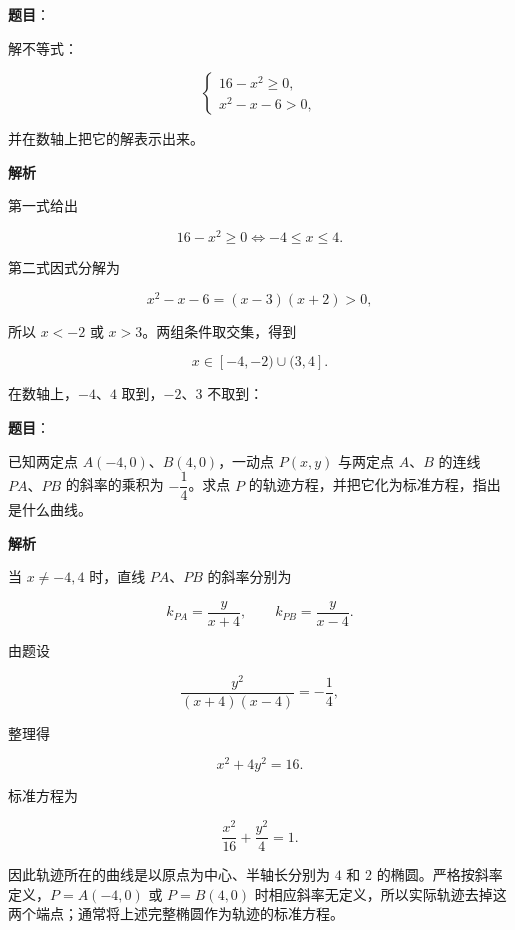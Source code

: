 \begin{answer}

\textbf{题目}：

解不等式：

\nopagebreak[4]
\[
\begin{cases}
16-x^2\geqslant0,\\
x^2-x-6>0,
\end{cases}
\]

并在数轴上把它的解表示出来。

\textbf{解析}

第一式给出

\nopagebreak[4]
\[
16-x^2\geqslant0\Longleftrightarrow -4\leqslant x\leqslant4.
\]

第二式因式分解为

\nopagebreak[4]
\[
x^2-x-6=(x-3)(x+2)>0,
\]

所以 $x<-2$ 或 $x>3$。两组条件取交集，得到

\nopagebreak[4]
\[
x\in[-4,-2)\cup(3,4].
\]

在数轴上，$-4$、$4$ 取到，$-2$、$3$ 不取到：
\nopagebreak[4]
\begin{center}\end{center}
\nopagebreak[4]

\end{answer}
\begin{answer}

\textbf{题目}：

已知两定点 $A(-4,0)$、$B(4,0)$，一动点 $P(x,y)$ 与两定点 $A\text{、}B$ 的连线 $PA\text{、}PB$ 的斜率的乘积为 $-\dfrac14$。求点 $P$ 的轨迹方程，并把它化为标准方程，指出是什么曲线。

\textbf{解析}

当 $x\ne-4,4$ 时，直线 $PA$、$PB$ 的斜率分别为

\nopagebreak[4]
\[
k_{PA}=\frac{y}{x+4},
\qquad
k_{PB}=\frac{y}{x-4}.
\]

由题设

\nopagebreak[4]
\[
\frac{y^2}{(x+4)(x-4)}=-\frac14,
\]

整理得

\nopagebreak[4]
\[
x^2+4y^2=16.
\]

标准方程为

\nopagebreak[4]
\[
\frac{x^2}{16}+\frac{y^2}{4}=1.
\]

因此轨迹所在的曲线是以原点为中心、半轴长分别为 $4$ 和 $2$ 的椭圆。严格按斜率定义，$P=A(-4,0)$ 或 $P=B(4,0)$ 时相应斜率无定义，所以实际轨迹去掉这两个端点；通常将上述完整椭圆作为轨迹的标准方程。


\end{answer}
